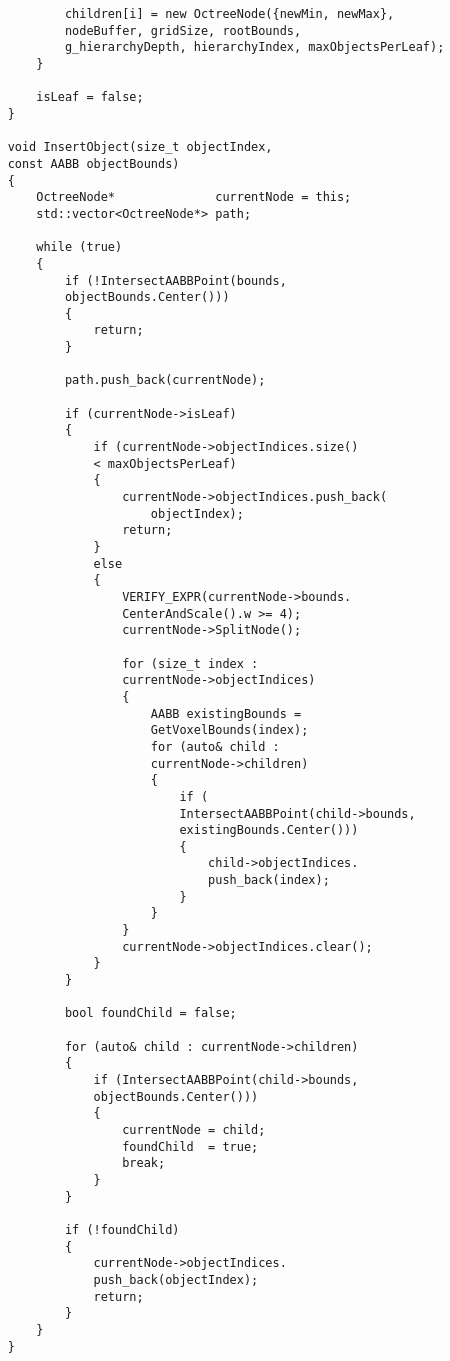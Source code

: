 \begin{lstlisting}
            children[i] = new OctreeNode({newMin, newMax}, 
            nodeBuffer, gridSize, rootBounds, 
            g_hierarchyDepth, hierarchyIndex, maxObjectsPerLeaf);
        }

        isLeaf = false;
    }

    void InsertObject(size_t objectIndex, 
    const AABB objectBounds)
    {
        OctreeNode*              currentNode = this;
        std::vector<OctreeNode*> path;

        while (true)
        {
            if (!IntersectAABBPoint(bounds, 
            objectBounds.Center()))
            {
                return;
            }

            path.push_back(currentNode);

            if (currentNode->isLeaf)
            {
                if (currentNode->objectIndices.size() 
                < maxObjectsPerLeaf)
                {
                    currentNode->objectIndices.push_back(
                        objectIndex);
                    return;
                }
                else
                {
                    VERIFY_EXPR(currentNode->bounds.
                    CenterAndScale().w >= 4);
                    currentNode->SplitNode();

                    for (size_t index : 
                    currentNode->objectIndices)
                    {
                        AABB existingBounds = 
                        GetVoxelBounds(index);
                        for (auto& child : 
                        currentNode->children)
                        {
                            if (
                            IntersectAABBPoint(child->bounds, 
                            existingBounds.Center()))
                            {
                                child->objectIndices.
                                push_back(index);
                            }
                        }
                    }
                    currentNode->objectIndices.clear();
                }
            }

            bool foundChild = false;

            for (auto& child : currentNode->children)
            {
                if (IntersectAABBPoint(child->bounds, 
                objectBounds.Center()))
                {
                    currentNode = child;
                    foundChild  = true;
                    break;
                }
            }

            if (!foundChild)
            {
                currentNode->objectIndices.
                push_back(objectIndex);
                return;
            }
        }
    }


\end{lstlisting}
